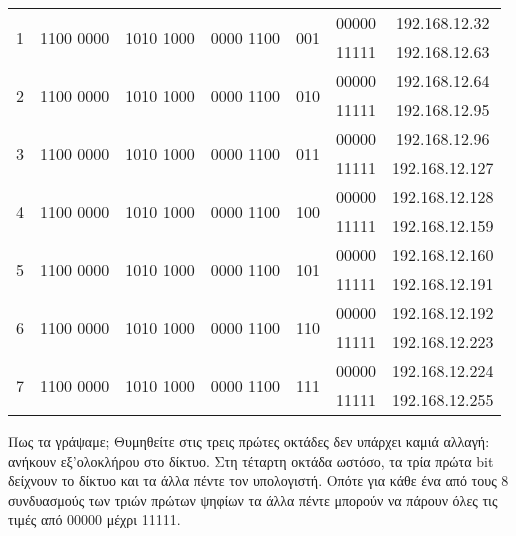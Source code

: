 \begin{center}
\begin{tabular}{|c|c|c|c|c|c|c|}
\multirow{2}{*}{1} & \multirow{2}{*}{1100 0000}  & \multirow{2}{*}{1010 1000} & \multirow{2}{*}{0000 1100}  & \multirow{2}{*}{001}  & 00000  & 192.168.12.32 \\  \cline{6-7} 
                  &  &  &  & & 11111 & 192.168.12.63 \\ \hline
\multirow{2}{*}{2} & \multirow{2}{*}{1100 0000}  & \multirow{2}{*}{1010 1000}  & \multirow{2}{*}{0000 1100} & \multirow{2}{*}{010}  & 00000 & 192.168.12.64 \\  \cline{6-7} 
                  &  &  &  &    & 11111 & 192.168.12.95 \\ \hline
\multirow{2}{*}{3} & \multirow{2}{*}{1100 0000}  & \multirow{2}{*}{1010 1000} & \multirow{2}{*}{0000 1100}  & \multirow{2}{*}{011}  & 00000 & 192.168.12.96 \\  
\cline{6-7} 
                  &  &   &  & & 11111 & 192.168.12.127 \\ \hline
\multirow{2}{*}{4} & \multirow{2}{*}{1100 0000} & \multirow{2}{*}{1010 1000}  & \multirow{2}{*}{0000 1100} & \multirow{2}{*}{100}  & 00000 & 192.168.12.128 \\  \cline{6-7} 
                  &  &  &   & & 11111 & 192.168.12.159 \\ \hline
\multirow{2}{*}{5} & \multirow{2}{*}{1100 0000}  & \multirow{2}{*}{1010 1000}  & \multirow{2}{*}{0000 1100} & \multirow{2}{*}{101}  & 00000 &  192.168.12.160 \\  
\cline{6-7} 
                  & & &  &  & 11111 &  192.168.12.191 \\ \hline
\multirow{2}{*}{6} & \multirow{2}{*}{1100 0000}  & \multirow{2}{*}{1010 1000 } & \multirow{2}{*}{0000 1100} & \multirow{2}{*}{110}  & 00000 & 192.168.12.192 \\  \cline{6-7} 
                  &  & &  &  & 11111 & 192.168.12.223 \\ \hline
\multirow{2}{*}{7} & \multirow{2}{*}{1100 0000}  & \multirow{2}{*}{1010 1000} & \multirow{2}{*}{0000 1100}  & \multirow{2}{*}{111}  & 00000  &  192.168.12.224 \\  \cline{6-7} 
                  &  &  & & & 11111 & 192.168.12.255 \\ \hline
\end{tabular}
\normalfont
\end{center}

Πως τα γράψαμε; Θυμηθείτε στις τρεις πρώτες οκτάδες δεν υπάρχει καμιά αλλαγή: ανήκουν εξ’ολοκλήρου στο δίκτυο. Στη τέταρτη οκτάδα ωστόσο, τα τρία πρώτα bit δείχνουν το δίκτυο και τα άλλα πέντε τον υπολογιστή. Οπότε για κάθε ένα από τους 8 συνδυασμούς των τριών πρώτων ψηφίων τα άλλα πέντε μπορούν να πάρουν όλες τις τιμές από 00000 μέχρι 11111.

